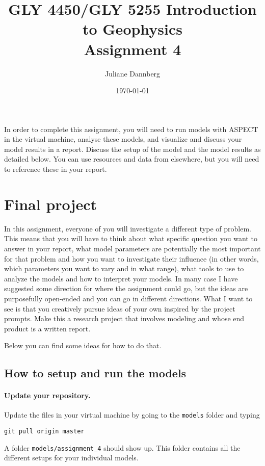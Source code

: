 \documentclass[notitlepage]{article}
\title{GLY 4450/GLY 5255 Introduction to Geophysics\\Assignment 4}
\author{Juliane Dannberg}
\date{\today}
\begin{document}
\maketitle

In order to complete this assignment, you will need to run models with ASPECT in the virtual machine, analyse these models, and visualize and discuss your model results in a report. Discuss the setup of the model and the model results as detailed below. You can use resources and data from elsewhere, but you will need to reference these in your report.



\section{Final project}

In this assignment, everyone of you will investigate a different type of problem. 
This means that you will have to think about what specific question you want to answer in your report, 
what model parameters are potentially the most important for that problem 
and how you want to investigate their influence (in other words, which parameters you want to vary and in what range),
what tools to use to analyze the models and how to interpret your models. 
In many case I have suggested some direction for where the assignment could go, 
but the ideas are purposefully open-ended and you can go in different directions. 
What I want to see is that you creatively pursue ideas of your own inspired by the project prompts. 
Make this a research project that involves modeling and whose end product is a written report.

Below you can find some ideas for how to do that. 

\subsection{How to setup and run the models}


\paragraph{Update your repository.}
Update the files in your virtual machine by going to the \texttt{models} folder and typing 

\begin{verbatim}
git pull origin master
\end{verbatim}

A folder \texttt{models/assignment\_4} should show up. This folder contains all the different setups
for your individual models. 
\end{document}
